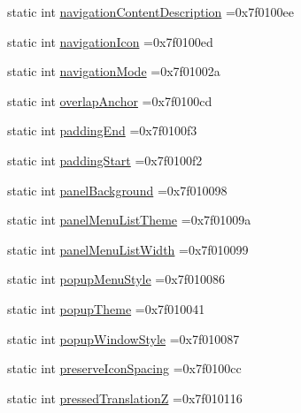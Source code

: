 \begin{DoxyCompactItemize}
\item 
static int \hyperlink{classandroid_1_1support_1_1design_1_1R_1_1attr_a26a0680c8c9447209795db42f11f7d95}{navigation\+Content\+Description} =0x7f0100ee
\item 
static int \hyperlink{classandroid_1_1support_1_1design_1_1R_1_1attr_a9ae2a9f1ec65d153e45bcda69eadbcf2}{navigation\+Icon} =0x7f0100ed
\item 
static int \hyperlink{classandroid_1_1support_1_1design_1_1R_1_1attr_a109c739e0d040aef57bdb0c1dadb4e48}{navigation\+Mode} =0x7f01002a
\item 
static int \hyperlink{classandroid_1_1support_1_1design_1_1R_1_1attr_a6431f4eaa762dbbcc2472210e6de4d03}{overlap\+Anchor} =0x7f0100cd
\item 
static int \hyperlink{classandroid_1_1support_1_1design_1_1R_1_1attr_ae87ba13c61369d6cb142278630e1ae38}{padding\+End} =0x7f0100f3
\item 
static int \hyperlink{classandroid_1_1support_1_1design_1_1R_1_1attr_a0664bf5d1b33cdf9ca567e82b1006290}{padding\+Start} =0x7f0100f2
\item 
static int \hyperlink{classandroid_1_1support_1_1design_1_1R_1_1attr_ad363e0649bee876bc29776da9e7507e5}{panel\+Background} =0x7f010098
\item 
static int \hyperlink{classandroid_1_1support_1_1design_1_1R_1_1attr_a3d266bd169b6d7779a9f6d6bd66d28b2}{panel\+Menu\+List\+Theme} =0x7f01009a
\item 
static int \hyperlink{classandroid_1_1support_1_1design_1_1R_1_1attr_ae2b662feeb9262657fe25b197684e764}{panel\+Menu\+List\+Width} =0x7f010099
\item 
static int \hyperlink{classandroid_1_1support_1_1design_1_1R_1_1attr_a390433602092ab37564f0a189f9099a0}{popup\+Menu\+Style} =0x7f010086
\item 
static int \hyperlink{classandroid_1_1support_1_1design_1_1R_1_1attr_a31e4e569ed674c1af7374b723ea84669}{popup\+Theme} =0x7f010041
\item 
static int \hyperlink{classandroid_1_1support_1_1design_1_1R_1_1attr_a4adafbb4bec0c032be0f4c8652e5ac2b}{popup\+Window\+Style} =0x7f010087
\item 
static int \hyperlink{classandroid_1_1support_1_1design_1_1R_1_1attr_abe8b81391e1e9e0383b96c02187df971}{preserve\+Icon\+Spacing} =0x7f0100cc
\item 
static int \hyperlink{classandroid_1_1support_1_1design_1_1R_1_1attr_a04a96d87b401abecc5a029d980972cd7}{pressed\+TranslationZ} =0x7f010116
\item 

\end{DoxyCompactItemize}
